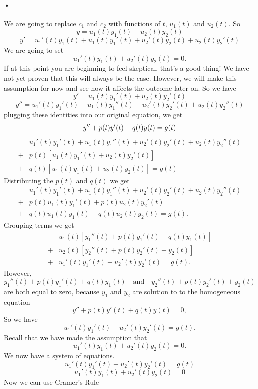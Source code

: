 \documentclass[font =22]{report}
\begin{document}
\paragraph{•}
We are going to replace $c_1$ and $c_2$ with functions of $t$, $u_1(t)$ and $u_2(t)$. 
So
\[
y = u_1(t)y_1(t) + u_2(t)y_2(t)
\]
\[
y' = u_1'(t)y_1(t) + u_1(t)y_1'(t) + u_2'(t)y_2(t) + u_2(t)y_2'(t)
\]
We are going to set 
\[
 u_1'(t)y_1(t) + u_2'(t)y_2(t) = 0.
\]
If at this point you are beginning to feel skeptical, that's a good thing! We have not yet proven that this will always be the case. However, we will make this assumption for now and see how it affects the outcome later on. So we have
\[
y' = u_1(t)y_1'(t) +  u_2(t)y_2'(t)
\]
\[
y'' = u_1'(t)y_1'(t)+u_1(t)y_1''(t) +  u_2'(t)y_2'(t) + u_2(t)y_2''(t)
\]
 plugging these identities into our original equation, we get
 \[
  y''+p(t)y'(t)+q(t)y(t) = g(t)\\
  \]
  \begin{align*}
  &u_1'(t)y_1'(t)+u_1(t)y_1''(t) +  u_2'(t)y_2'(t) + u_2(t)y_2''(t)\\
  +  &p(t)[u_1(t)y_1'(t) +  u_2(t)y_2'(t)] \\
  + &q(t)[u_1(t)y_1(t) + u_2(t)y_2(t)] = g(t)
\end{align*}
Distributing the $p(t)$ and $q(t)$ we get
\begin{align*}
&u_1'(t)y_1'(t)+u_1(t)y_1''(t) +  u_2'(t)y_2'(t) + u_2(t)y_2''(t)\\
  + &p(t)u_1(t)y_1'(t) +p(t)u_2(t)y_2'(t)\\ 
  + &q(t)u_1(t)y_1(t)+q(t)u_2(t)y_2(t) = g(t).
\end{align*}
Grouping terms we get
\begin{align*}
&u_1(t)[y_1''(t)+p(t)y_1'(t)+q(t)y_1(t)]\\
+ &u_2(t)[y_2''(t)+p(t)y_2'(t)+y_2(t)]\\
+ &u_1'(t)y_1'(t) + u_2'(t)y_2'(t) = g(t).
\end{align*}
 However, 
 \[
 y_1''(t)+p(t)y_1'(t)+q(t)y_1(t) \quad \text{and} \quad y_2''(t)+p(t)y_2'(t)+y_2(t)
 \]
are both equal to zero, because $y_1$ and $y_2$ are solution to to the homogeneous equation 
\[
y''+p(t)y'(t)+q(t)y(t) = 0 ,
\]
So we have 
 \[
  u_1'(t)y_1'(t) + u_2'(t)y_2'(t) = g(t).
 \]
 Recall that we have made the assumption that 
 \[
 u_1'(t)y_1(t) + u_2'(t)y_2(t) = 0.
 \]
 We now have a system of equations.
 \[
 u_1'(t)y_1'(t) + u_2'(t)y_2'(t) = g(t)
 \]
\[
 u_1'(t)y_1(t) + u_2'(t)y_2(t) = 0
\] 
 Now we can use Cramer's Rule 
\end{document}
